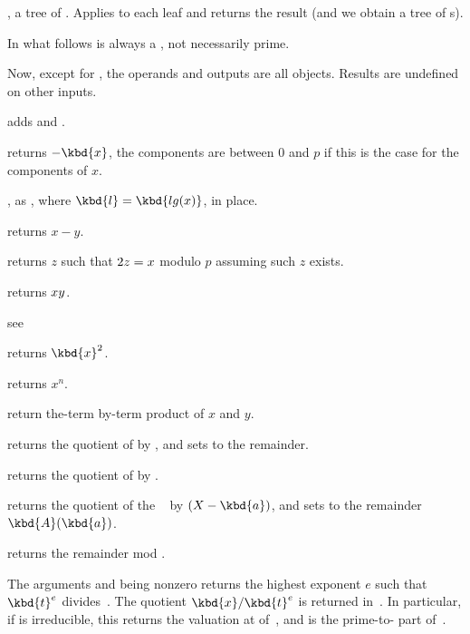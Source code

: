 ,  a tree of . Applies
 to each leaf and returns the result (and we obtain a tree
of s).

 In what follows  is always a ,
not necessarily prime.

\noindent Now, except for , the operands and outputs are all 
objects. Results are undefined on other inputs.

 adds  and .

 returns $-\kbd{x}$, the components are
between $0$ and $p$ if this is the case for the components of $x$.

, as , where
$\kbd{l} = \kbd{lg(x)}$, in place.

 returns $x-y$.

 returns $z$ such that $2\*z = x$ modulo
$p$ assuming such $z$ exists.

 returns $x\*y$.

see 

 returns $\kbd{x}^2$.

 returns $x^n$.

 return the-term by-term product of $x$
and $y$.

 returns the quotient
of  by , and sets  to the remainder.

 returns the quotient of  by
.

 returns the
quotient of the ~ by $(X - \kbd{a})$, and sets  to the
remainder $\kbd{A}(\kbd{a})$.

 returns the remainder  mod
.

 The arguments  and
 being nonzero  returns the highest exponent $e$ such that
$\kbd{t}^{e}$ divides~. The quotient $\kbd{x}/\kbd{t}^{e}$ is returned
in~. In particular, if  is irreducible, this returns the
valuation at  of~, and  is the prime-to- part
of~.

